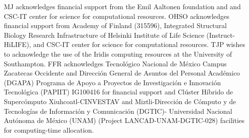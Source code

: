 \documentclass[aps,prl,superscriptaddress,twocolumn]{revtex4}
\begin{document}
\begin{acknowledgments}
  MJ acknowledges financial support from the Emil Aaltonen foundation and
  and CSC-IT center for science for computational resources.
  OHSO acknowledges financial support from Academy of Finland (315596),
  Integrated Structural Biology Research Infrastructure of
  Helsinki Institute of Life Science (Instruct-HiLIFE), and
  CSC-IT center for science for computational resources.
  TJP wishes to acknowledge the use of the Iridis computing resources at the University of Southampton.
  FFR acknowledges Tecnol\'{o}gico Nacional de M\'{e}xico Campus Zacatecas Occidente and
  Direcci\'{o}n General de Asuntos del Personal Acad\'{e}mico (DGAPA)
  Programa de Apoyo a Proyectos de Investigaci\'{o}n e Innovaci\'{o}n
  Tecnol\'{o}gica (PAPIIT) IG100416 for financial support and Cl\'{u}ster
  H\'{i}brido de Superc\'{o}mputo Xiuhcoatl-CINVESTAV and Miztli-Direcci\'{o}n de
  C\'{o}mputo y de Tecnolog\'{i}as de Informaci\'{o}n y Comunicaci\'{o}n (DGTIC)-
  Universidad Nacional Aut\'{o}noma de M\'{e}xico (UNAM) (Project
  LANCAD-UNAM-DGTIC-028) facilities for computing-time allocation.
\end{acknowledgments}

\newpage





\listoftodos
\end{document}
